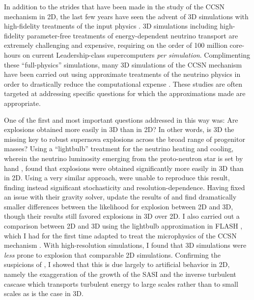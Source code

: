 In addition to the strides that have been made in the study of the CCSN mechanism in 2D, the last few years have seen the advent of 3D simulations with high-fidelity treatments of the input physics \citep[e.g.,][]{Hanke:2013, Tamborra:2014, Melson:2015, Melson:2015a, Lentz:2015, Janka:2016}.
3D simulations including high-fidelity parameter-free treatments of energy-dependent neutrino transport are extremely challenging and expensive, requiring on the order of 100 million core-hours on current Leadership-class supercomputers {\it per simulation}.
Complimenting these ``full-physics'' simulations, many 3D simulations of the CCSN mechanism have been carried out using approximate treatments of the neutrino physics in order to drastically reduce the computational expense \citep[e.g.,][]{Nordhaus:2010, Hanke:2012, Burrows:2012, Couch:2013a, Murphy:2013, Dolence:2013, Couch:2013b, Iwakami:2014, Couch:2014, Couch:2015}.
These studies are often targeted at addressing specific questions for which the approximations made are appropriate.

One of the first and most important questions addressed in this way was: Are explosions obtained more easily in 3D than in 2D?  In other words, is 3D the missing key to robust supernova explosions across the broad range of progenitor masses?
Using a ``lightbulb'' treatment for the neutrino heating and cooling, wherein the neutrino luminosity emerging from the proto-neutron star is set by hand \citep{Murphy:2008}, \citet{Nordhaus:2010} found that explosions were obtained significantly more easily in 3D than in 2D.
Using a very similar approach, \citet{Hanke:2012} were unable to reproduce this result, finding instead significant stochasticity and resolution-dependence.
Having fixed an issue with their gravity solver, \citet{Dolence:2013} update the results of \citet{Nordhaus:2010} and find dramatically smaller differences between the likelihood for explosion between 2D and 3D, though their results still favored explosions in 3D over 2D.
I also carried out a comparison between 2D and 3D using the lightbulb approximation in FLASH \citep{Fryxell:2000, Dubey:2008}, which I had for the first time adapted to treat the microphysics of the CCSN mechanism \citep{Couch:2013a}.
With high-resolution simulations, I found that 3D simulations were {\it less} prone to explosion that comparable 2D simulations.
Confirming the suspicions of \citet{Hanke:2012}, I showed that this is due largely to artificial behavior in 2D, namely the exaggeration of the growth of the SASI and the inverse turbulent cascase which transports turbulent energy to large scales rather than to small scales as is the case in 3D.

